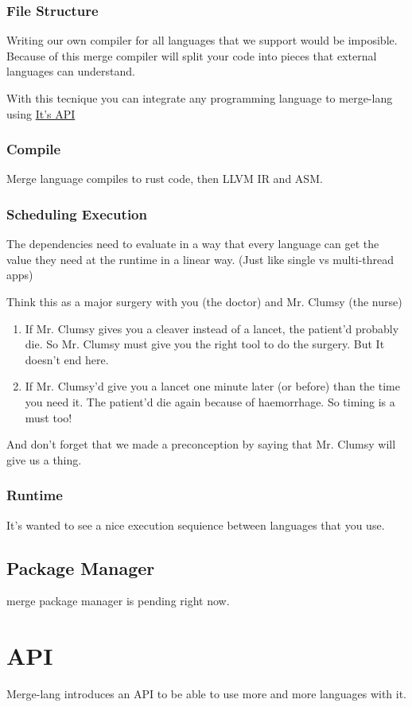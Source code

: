 \documentclass[9pt,twocolumn]{article}
\begin{document}
\subsubsection{File Structure}
\label{sec:orgbe66ccb}
Writing our own compiler for all languages that we support would be imposible. Because of this merge compiler will split your code into pieces that external languages can understand.

With this tecnique you can integrate any programming language to merge-lang using \hyperref[sec:orgbfd1349]{It's API}


\subsubsection{Compile}
\label{sec:org00c9a59}
Merge language compiles to rust code, then LLVM IR and ASM.

\subsubsection{Scheduling Execution}
\label{sec:org04746a5}

The dependencies need to evaluate in a way that every language can get the value they need at the runtime in a linear way. (Just like single vs multi-thread apps)

Think this as a major surgery with you (the doctor) and Mr. Clumsy (the nurse)

\begin{enumerate}
\item If Mr. Clumsy gives you a cleaver instead of a lancet, the patient'd probably die. So Mr. Clumsy must give you the right tool to do the surgery. But It doesn't end here.
\item If Mr. Clumsy'd give you a lancet one minute later (or before) than the time you need it. The patient'd die again because of haemorrhage. So timing is a must too!
\end{enumerate}

And don't forget that we made a preconception by saying that Mr. Clumsy will give us a thing.

\subsubsection{Runtime}
\label{sec:org477376b}
It's wanted to see a nice execution sequience between languages that you use.

\subsection{Package Manager}
\label{sec:orgea576ce}
merge package manager is pending right now.

\section{API}
\label{sec:orgbfd1349}
Merge-lang introduces an API to be able to use more and more languages with it.
\end{document}
